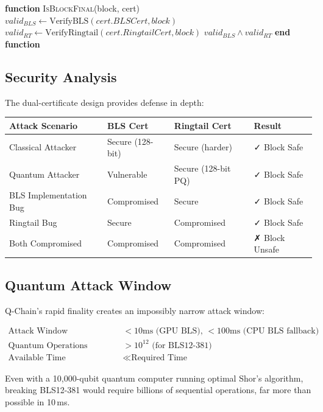 \documentclass[11pt]{article}
\begin{document}
\begin{algorithmic}[1]
\State \textbf{function} \textsc{IsBlockFinal}(block, cert)
    \State $valid_{BLS} \gets \text{VerifyBLS}(cert.BLSCert, block)$
    \State $valid_{RT} \gets \text{VerifyRingtail}(cert.RingtailCert, block)$
    \State \Return $valid_{BLS} \land valid_{RT}$
\State \textbf{end function}
\end{algorithmic}


\subsection{Security Analysis}

The dual-certificate design provides defense in depth:

\begin{table}[h]
\centering
\small
\begin{tabular}{@{}llll@{}}
\toprule
\textbf{Attack Scenario} & \textbf{BLS Cert} & \textbf{Ringtail Cert} & \textbf{Result} \\
\midrule
Classical Attacker & Secure (128-bit) & Secure (harder) & ✓ Block Safe \\
Quantum Attacker & Vulnerable & Secure (128-bit PQ) & ✓ Block Safe \\
BLS Implementation Bug & Compromised & Secure & ✓ Block Safe \\
Ringtail Bug & Secure & Compromised & ✓ Block Safe \\
Both Compromised & Compromised & Compromised & ✗ Block Unsafe \\
\bottomrule
\end{tabular}

\label{tab:security}
\end{table}

\subsection{Quantum Attack Window}

Q-Chain's rapid finality creates an impossibly narrow attack window:

\begin{align}
\text{Attack Window} &< 10\text{ms (GPU BLS), } < 100\text{ms (CPU BLS fallback)} \\
\text{Quantum Operations Required} &> 10^{12} \text{ (for BLS12-381)} \\
\text{Available Time} &\ll \text{Required Time}
\end{align}

Even with a 10,000-qubit quantum computer running optimal Shor's algorithm, breaking BLS12-381 would require billions of sequential operations, far more than possible in 10\,ms.
\end{document}
